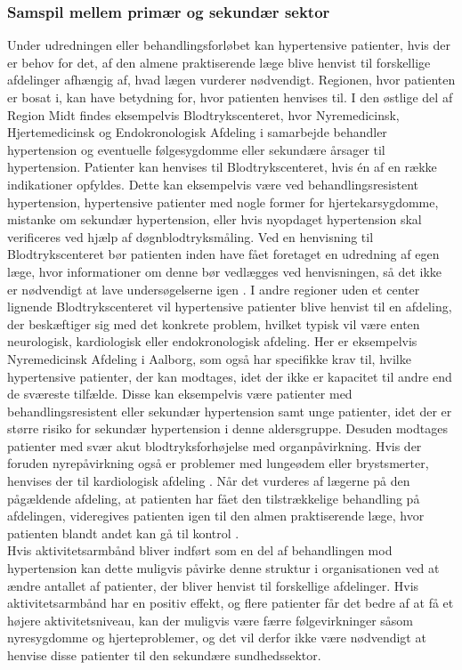 \subsubsection{Samspil mellem primær og sekundær sektor}
Under udredningen eller behandlingsforløbet kan hypertensive patienter, hvis der er behov for det, af den almene praktiserende læge blive henvist til forskellige afdelinger afhængig af, hvad lægen vurderer nødvendigt. Regionen, hvor patienten er bosat i, kan have betydning for, hvor patienten henvises til. I den østlige del af Region Midt findes eksempelvis Blodtrykscenteret, hvor Nyremedicinsk, Hjertemedicinsk og Endokronologisk Afdeling i samarbejde behandler hypertension og eventuelle følgesygdomme eller sekundære årsager til hypertension. Patienter kan henvises til Blodtrykscenteret, hvis én af en række indikationer opfyldes. Dette kan eksempelvis være ved behandlingsresistent hypertension, hypertensive patienter med nogle former for hjertekarsygdomme, mistanke om sekundær hypertension, eller hvis nyopdaget hypertension skal verificeres ved hjælp af døgnblodtryksmåling. Ved en henvisning til Blodtrykscenteret bør patienten inden have fået foretaget en udredning af egen læge, hvor informationer om denne bør vedlægges ved henvisningen, så det ikke er nødvendigt at lave undersøgelserne igen \citep{aarhusuniversitetshopsital}. I andre regioner uden et center lignende Blodtrykscenteret vil hypertensive patienter blive henvist til en afdeling, der beskæftiger sig med det konkrete problem, hvilket typisk vil være enten neurologisk, kardiologisk eller endokronologisk afdeling. Her er eksempelvis Nyremedicinsk Afdeling i Aalborg, som også har specifikke krav til, hvilke hypertensive patienter, der kan modtages, idet der ikke er kapacitet til andre end de sværeste tilfælde. Disse kan eksempelvis være patienter med behandlingsresistent eller sekundær hypertension samt unge patienter, idet der er større risiko for sekundær hypertension i denne aldersgruppe. Desuden modtages patienter med svær akut blodtryksforhøjelse med organpåvirkning. Hvis der foruden nyrepåvirkning også er problemer med lungeødem eller brystsmerter, henvises der til kardiologisk afdeling \citep{buur2011}. Når det vurderes af lægerne på den pågældende afdeling, at patienten har fået den tilstrækkelige behandling på afdelingen, videregives patienten igen til den almen praktiserende læge, hvor patienten blandt andet kan gå til kontrol \citep{sundhedsstyrelsen2010, lodberg2016}. \\
Hvis aktivitetsarmbånd bliver indført som en del af behandlingen mod hypertension kan dette muligvis påvirke denne struktur i organisationen ved at ændre antallet af patienter, der bliver henvist til forskellige afdelinger. Hvis aktivitetsarmbånd har en positiv effekt, og flere patienter får det bedre af at få et højere aktivitetsniveau, kan der muligvis være færre følgevirkninger såsom nyresygdomme og hjerteproblemer, og det vil derfor ikke være nødvendigt at henvise disse patienter til den sekundære sundhedssektor. 

